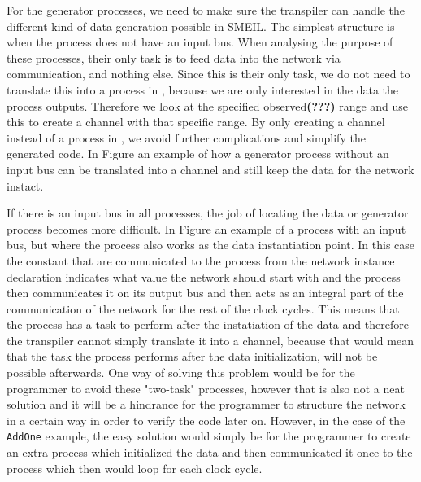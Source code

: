 For the generator processes, we need to make sure the transpiler can handle the different kind of data generation possible in SMEIL.
The simplest structure is when the process does not have an input bus. When analysing the purpose of these processes, their only task is to feed data into the network via communication, and nothing else. Since this is their only task, we do not need to translate this into a process in \cspm, because we are only interested in the data the process outputs. Therefore we look at the specified observed\textbf{(???)} range and use this to create a \cspm channel with that specific range. By only creating a channel instead of a process in \cspm, we avoid further complications and simplify the generated code. In Figure %
an example of how a generator process without an input bus can be translated into a \cspm channel and still keep the data for the network instact.

If there is an input bus in all processes, the job of locating the data or generator process becomes more difficult. In Figure %
an example of a process with an input bus, but where the process also works as the data instantiation point. In this case the constant that are communicated to the process from the network instance declaration indicates what value the network should start with and the process then communicates it on its output bus and then acts as an integral part of the communication of the network for the rest of the clock cycles. This means that the process has a task to perform after the instatiation of the data and therefore the transpiler cannot simply translate it into a \cspm channel, because that would mean that the task the process performs after the data initialization, will not be possible afterwards. One way of solving this problem would be for the programmer to avoid these "two-task" processes, however that is also not a neat solution and it will be a hindrance for the programmer to structure the network in a certain way in order to verify the code later on. However, in the case of the \texttt{AddOne} example, the easy solution would simply be for the programmer to create an extra process which initialized the data and then communicated it once to the process which then would loop for each clock cycle.

